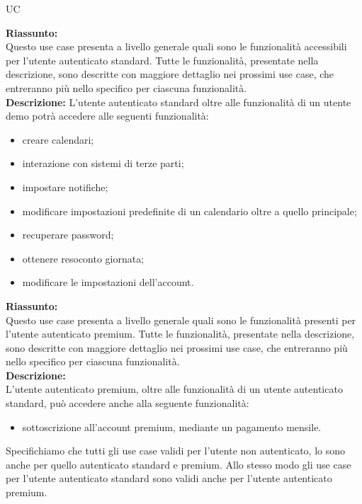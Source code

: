 \begin{listaPersonale}{UC}
\begin{listaPersonale2} [UC] {}
                \textbf{Riassunto:} \\
                Questo use case presenta a livello generale quali sono le funzionalità accessibili per l'utente autenticato standard. Tutte le funzionalità, presentate nella descrizione, sono descritte con maggiore dettaglio nei prossimi use case, che entreranno più nello specifico per ciascuna funzionalità. \\
                \textbf{Descrizione:}
                L'utente autenticato standard oltre alle funzionalità di un utente demo potrà accedere alle seguenti funzionalità:
                \begin{itemize}
                    \item creare calendari;
                    \item interazione con sistemi di terze parti;
                    \item impostare notifiche;
                    \item modificare impostazioni predefinite di un calendario oltre a quello principale;
                    \item recuperare password;
                    \item ottenere resoconto giornata;
                    \item modificare le impostazioni dell'account.
                \end{itemize}
            \textbf{Riassunto:} \\
            Questo use case presenta a livello generale quali sono le funzionalità presenti per l'utente autenticato premium. Tutte le funzionalità, presentate nella descrizione, sono descritte con maggiore dettaglio nei prossimi use case, che entreranno più nello specifico per ciascuna funzionalità. \\
            \textbf{Descrizione:} \\
            L'utente autenticato premium, oltre alle funzionalità di un utente autenticato standard, può accedere anche alla seguente funzionalità:
            \begin{itemize}
                \item sottoscrizione all'account premium, mediante un pagamento mensile.
            \end{itemize}
    \end{listaPersonale2}
    Specifichiamo che tutti gli use case validi per l'utente non autenticato, lo sono anche per quello autenticato standard e premium. Allo stesso modo gli use case per l'utente autenticato standard sono validi anche per l'utente autenticato premium.



\end{listaPersonale}
